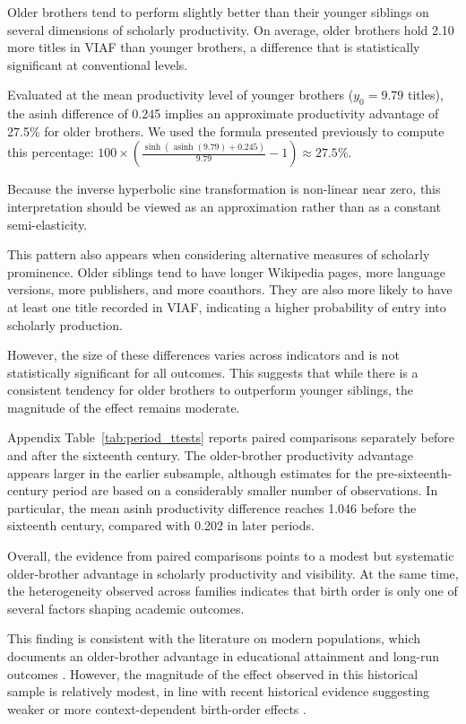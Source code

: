 Older brothers tend to perform slightly better than their younger siblings on several dimensions of scholarly productivity. On average, older brothers hold 2.10 more titles in VIAF than younger brothers, a difference that is statistically significant at conventional levels.

Evaluated at the mean productivity level of younger brothers ($y_0 = 9.79$ titles), the asinh difference of 0.245 implies an approximate productivity advantage of 27.5\% for older brothers. We used the formula presented previously to compute this percentage: $100 \times \left(\frac{\sinh\left(\operatorname{asinh}(9.79)+0.245\right)}{9.79}-1\right)\approx 27.5\%$.

Because the inverse hyperbolic sine transformation is non-linear near zero, this interpretation should be viewed as an approximation rather than as a constant semi-elasticity.

This pattern also appears when considering alternative measures of scholarly prominence. Older siblings tend to have longer Wikipedia pages, more language versions, more publishers, and more coauthors. They are also more likely to have at least one title recorded in VIAF, indicating a higher probability of entry into scholarly production.

However, the size of these differences varies across indicators and is not statistically significant for all outcomes. This suggests that while there is a consistent tendency for older brothers to outperform younger siblings, the magnitude of the effect remains moderate.

Appendix Table~\ref{tab:period_ttests} reports paired comparisons separately before and after the sixteenth century. The older-brother productivity advantage appears larger in the earlier subsample, although estimates for the pre-sixteenth-century period are based on a considerably smaller number of observations. In particular, the mean asinh productivity difference reaches 1.046 before the sixteenth century, compared with 0.202 in later periods.

Overall, the evidence from paired comparisons points to a modest but systematic older-brother advantage in scholarly productivity and visibility. At the same time, the heterogeneity observed across families indicates that birth order is only one of several factors shaping academic outcomes.

This finding is consistent with the literature on modern populations, which documents an older-brother advantage in educational attainment and long-run outcomes \citep{Black2005, Behrman1986}. However, the magnitude of the effect observed in this historical sample is relatively modest, in line with recent historical evidence suggesting weaker or more context-dependent birth-order effects \citep{ClarkCummins2024}.

